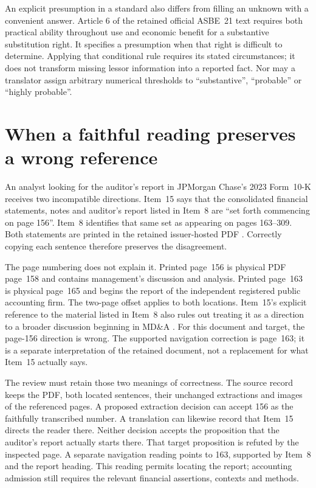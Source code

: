 An explicit presumption in a standard also differs from filling an unknown with
a convenient answer. Article 6 of the retained official ASBE~21 text requires
both practical ability throughout use and economic benefit for a substantive
substitution right. It specifies a presumption when that right is difficult to
determine. Applying that conditional rule requires its stated circumstances;
it does not transform missing lessor information into a reported fact. Nor may
a translator assign arbitrary numerical thresholds to ``substantive'',
``probable'' or ``highly probable''.

\section{When a faithful reading preserves a wrong reference}
\label{sec:reference-conflict}

An analyst looking for the auditor's report in JPMorgan Chase's 2023 Form~10-K
receives two incompatible directions. Item~15 says that the consolidated
financial statements, notes and auditor's report listed in Item~8 are
``set forth commencing on page 156''. Item~8 identifies that same set as
appearing on pages 163--309. Both statements are printed in the retained
issuer-hosted PDF \citep[Items 8 and 15, printed pp.~36 and 40]{jpmorgan2023tenk}.
Correctly copying each sentence therefore preserves the disagreement.

The page numbering does not explain it. Printed page~156 is physical PDF
page~158 and contains management's discussion and analysis. Printed page~163
is physical page~165 and begins the report of the independent registered public
accounting firm. The two-page offset applies to both locations. Item~15's
explicit reference to the material listed in Item~8 also rules out treating
it as a direction to a broader discussion beginning in MD\&A
\citep[printed pp.~156 and 163]{jpmorgan2023tenk}. For this document and
target, the page-156 direction is wrong. The supported navigation correction
is page~163; it is a separate interpretation of the retained document, not
a replacement for what Item~15 actually says.

The review must retain those two meanings of correctness. The source record
keeps the PDF, both located sentences, their unchanged extractions and images
of the referenced pages. A proposed extraction decision can accept 156 as
the faithfully transcribed number. A translation can likewise record that
Item~15 directs the reader there. Neither decision accepts the proposition
that the auditor's report actually starts there. That target proposition is
refuted by the inspected page. A separate navigation reading points to 163,
supported by Item~8 and the report heading. This reading permits locating the
report; accounting admission still requires the relevant financial assertions,
contexts and methods.

